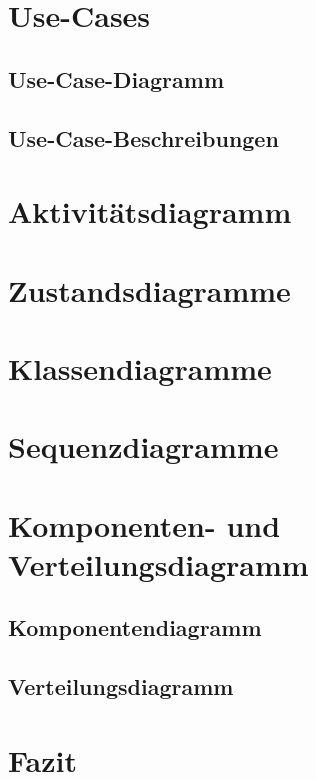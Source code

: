 \documentclass[a4paper, 12pp]{article}
\begin{document}
\section{Use-Cases}
\subsection{Use-Case-Diagramm}
\subsection{Use-Case-Beschreibungen}
\section{Aktivitätsdiagramm}
\section{Zustandsdiagramme}
\section{Klassendiagramme}
\section{Sequenzdiagramme}
\section{Komponenten- und Verteilungsdiagramm}
\subsection{Komponentendiagramm}
\subsection{Verteilungsdiagramm}
\section{Fazit}
\end{document}
